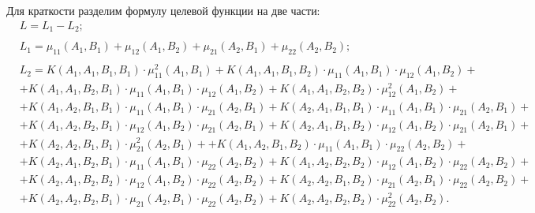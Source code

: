 \documentclass[12pt,a4paper,oneside]{article}
\begin{document}
\par
Для краткости разделим формулу целевой функции на две части:
\mbox{}
\begin{eqnarray*}
& L = L_1 - L_2;\\ \\
& L_1 = \mu_{11}(A_1, B_1) + \mu_{12}(A_1, B_2) + \mu_{21}(A_2, B_1) + \mu_{22}(A_2, B_2);\\ \\
&L_2 = K(A_1, A_1, B_1, B_1) \cdot \mu^{2}_{11}(A_1, B_1)
+ K(A_1, A_1, B_1, B_2) \cdot \mu_{11}(A_1, B_1) \cdot \mu_{12}(A_1, B_2) +\\
&+ K(A_1, A_1, B_2, B_1) \cdot \mu_{11}(A_1, B_1) \cdot \mu_{12}(A_1, B_2)
+ K(A_1, A_1, B_2, B_2) \cdot \mu^{2}_{12}(A_1, B_2) +\\
&+ K(A_1, A_2, B_1, B_1) \cdot \mu_{11}(A_1, B_1) \cdot \mu_{21}(A_2, B_1)
+ K(A_2, A_1, B_1, B_1) \cdot \mu_{11}(A_1, B_1) \cdot \mu_{21}(A_2, B_1) +\\
&+ K(A_1, A_2, B_2, B_1) \cdot \mu_{12}(A_1, B_2) \cdot \mu_{21}(A_2, B_1)
+ K(A_2, A_1, B_1, B_2) \cdot \mu_{12}(A_1, B_2) \cdot \mu_{21}(A_2, B_1) +\\
&+ K(A_2, A_2, B_1, B_1) \cdot \mu^{2}_{21}(A_2, B_1)+
+ K(A_1, A_2, B_1, B_2) \cdot \mu_{11}(A_1, B_1) \cdot \mu_{22}(A_2, B_2)+\\
&+ K(A_2, A_1, B_2, B_1) \cdot \mu_{11}(A_1, B_1) \cdot \mu_{22}(A_2, B_2)
+ K(A_1, A_2, B_2, B_2) \cdot \mu_{12}(A_1, B_2) \cdot \mu_{22}(A_2, B_2) +\\
&+ K(A_2, A_1, B_2, B_2) \cdot \mu_{12}(A_1, B_2) \cdot \mu_{22}(A_2, B_2)
+ K(A_2, A_2, B_1, B_2) \cdot \mu_{21}(A_2, B_1) \cdot \mu_{22}(A_2, B_2) +\\
&+ K(A_2, A_2, B_2, B_1) \cdot \mu_{21}(A_2, B_1) \cdot \mu_{22}(A_2, B_2)
+ K(A_2, A_2, B_2, B_2) \cdot \mu^{2}_{22}(A_2, B_2).
\end{eqnarray*}
\end{document}
